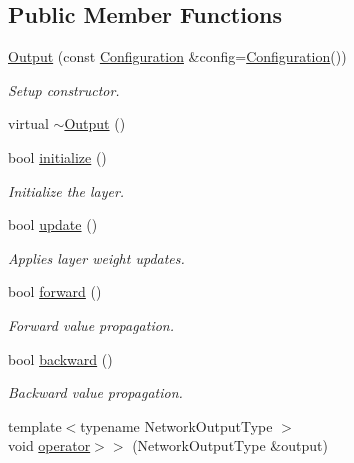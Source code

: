 \subsection*{Public Member Functions}
\begin{DoxyCompactItemize}
\item 
\hyperlink{classffnn_1_1layer_1_1_output_aba563bb3b8984fe99d87872364367131}{Output} (const \hyperlink{classffnn_1_1layer_1_1_output_a9e57e6ca1764925cea614e32886a1568}{Configuration} \&config=\hyperlink{classffnn_1_1layer_1_1_output_a9e57e6ca1764925cea614e32886a1568}{Configuration}())
\begin{DoxyCompactList}\small\item\em Setup constructor. \end{DoxyCompactList}\item 
virtual \hyperlink{classffnn_1_1layer_1_1_output_adbe7b418cbcae313ab79ffa79cc00f74}{$\sim$\-Output} ()
\item 
bool \hyperlink{classffnn_1_1layer_1_1_output_a8edca90e7ac402cd24c9872cf784a4de}{initialize} ()
\begin{DoxyCompactList}\small\item\em Initialize the layer. \end{DoxyCompactList}\item 
bool \hyperlink{classffnn_1_1layer_1_1_output_a923a4e72deaa227aa1635dcfb5220ec3}{update} ()
\begin{DoxyCompactList}\small\item\em Applies layer weight updates. \end{DoxyCompactList}\item 
bool \hyperlink{classffnn_1_1layer_1_1_output_a1830ecc821448395f5f3128175200f30}{forward} ()
\begin{DoxyCompactList}\small\item\em Forward value propagation. \end{DoxyCompactList}\item 
bool \hyperlink{classffnn_1_1layer_1_1_output_ac34f7c18bb9f0b3cab9b9c78d9794874}{backward} ()
\begin{DoxyCompactList}\small\item\em Backward value propagation. \end{DoxyCompactList}\item 
{\footnotesize template$<$typename Network\-Output\-Type $>$ }\\void \hyperlink{classffnn_1_1layer_1_1_output_a7e1b3e02e040b6c6522c688937ed5512}{operator$>$$>$} (Network\-Output\-Type \&output)

\end{DoxyCompactItemize}
